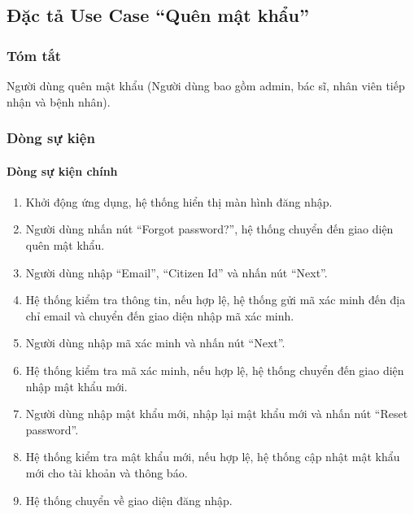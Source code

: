 \subsection{Đặc tả Use Case ``Quên mật khẩu''}

\subsubsection{Tóm tắt}
Người dùng quên mật khẩu (Người dùng bao gồm admin, bác sĩ, nhân viên tiếp nhận và bệnh nhân).

\subsubsection{Dòng sự kiện}
\paragraph{\textbf{Dòng sự kiện chính}}
\begin{enumerate}
  \item Khởi động ứng dụng, hệ thống hiển thị màn hình đăng nhập.
  \item Người dùng nhấn nút ``Forgot password?'', hệ thống chuyển đến giao diện quên mật khẩu.
  \item Người dùng nhập ``Email'', ``Citizen Id'' và nhấn nút ``Next''.
  \item Hệ thống kiểm tra thông tin, nếu hợp lệ, hệ thống gửi mã xác minh đến địa chỉ email và chuyển đến giao diện nhập mã xác minh.
  \item Người dùng nhập mã xác minh và nhấn nút ``Next''.
  \item Hệ thống kiểm tra mã xác minh, nếu hợp lệ, hệ thống chuyển đến giao diện nhập mật khẩu mới.
  \item Người dùng nhập mật khẩu mới, nhập lại mật khẩu mới và nhấn nút ``Reset password''.
  \item Hệ thống kiểm tra mật khẩu mới, nếu hợp lệ, hệ thống cập nhật mật khẩu mới cho tài khoản và thông báo.
  \item Hệ thống chuyển về giao diện đăng nhập.
\end{enumerate}

